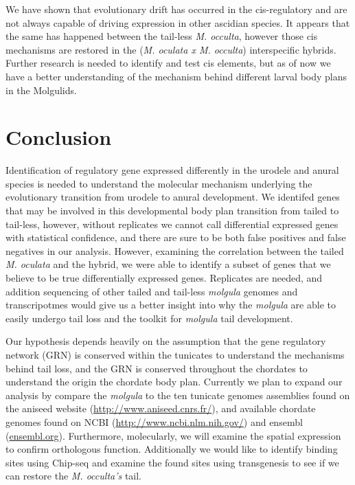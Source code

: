 We have shown that evolutionary drift has occurred in the cis-regulatory and are not always capable of driving expression in other ascidian species. It appears that the same has happened between the tail-less \textit{M. occulta}, however those cis mechanisms are restored in the (\textit{M. oculata x M. occulta}) interspecific hybrids. Further research is needed to identify and test cis elements, but as of now we have a better understanding of the mechanism behind different larval body plans in the Molgulids. 

\section{Conclusion}

Identification of regulatory gene expressed differently in the urodele and anural species is needed to understand the molecular mechanism underlying the evolutionary transition from urodele to anural development. We identifed genes that may be involved in this developmental body plan transition from tailed to tail-less, however, without replicates we cannot call differential expressed genes with statistical confidence, and there are sure to be both false positives and false negatives in our analysis. However, examining the correlation between the tailed \textit{M. oculata} and the hybrid, we were able to identify a subset of genes that we believe to be true differentially expressed genes. Replicates are needed, and addition sequencing of other tailed and tail-less \textit{molgula} genomes and transcripotmes would give us a better insight into why the \textit{molgula} are able to easily undergo tail loss and the toolkit for \textit{molgula} tail development. 

Our hypothesis depends heavily on the assumption that the gene regulatory network (GRN) is conserved within the tunicates to understand the mechanisms behind tail loss, and the GRN is conserved throughout the chordates to understand the origin the chordate body plan. Currently we plan to expand our analysis by compare the \textit{molgula} to the ten tunicate genomes assemblies found on the aniseed website (\url{http://www.aniseed.cnrs.fr/}), and available chordate genomes found on NCBI (\url{http://www.ncbi.nlm.nih.gov/}) and ensembl (\url{ensembl.org}). Furthermore, molecularly, we will examine the spatial expression to confirm orthologous function.  Additionally we would like to identify binding sites using Chip-seq and examine the found sites using transgenesis to see if we can restore the \textit{M. occulta's} tail.


